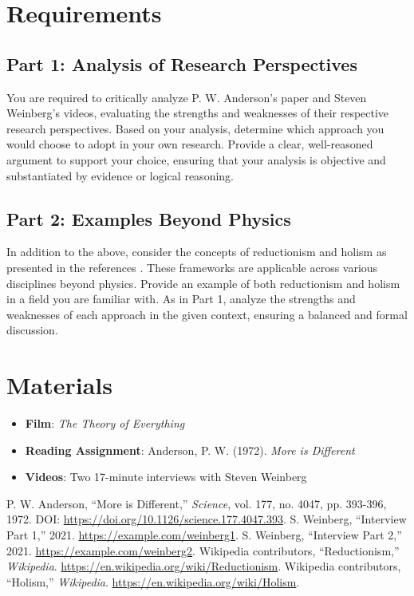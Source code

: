 \documentclass[a4paper,12pt]{article}
\begin{document}
\section*{Requirements}

\subsection*{Part 1: Analysis of Research Perspectives}

You are required to critically analyze P. W. Anderson's paper and Steven Weinberg’s videos, evaluating the strengths and weaknesses of their respective research perspectives. Based on your analysis, determine which approach you would choose to adopt in your own research. Provide a clear, well-reasoned argument to support your choice, ensuring that your analysis is objective and substantiated by evidence or logical reasoning.

\subsection*{Part 2: Examples Beyond Physics}

In addition to the above, consider the concepts of reductionism and holism as presented in the references \cite{WikipediaHolism, WikipediaReductionism}. These frameworks are applicable across various disciplines beyond physics. Provide an example of both reductionism and holism in a field you are familiar with. As in Part 1, analyze the strengths and weaknesses of each approach in the given context, ensuring a balanced and formal discussion.


\section*{Materials}

\begin{itemize}
    \item \textbf{Film}: \textit{The Theory of Everything}
    \item \textbf{Reading Assignment}: Anderson, P. W. (1972). \textit{More is Different} \cite{doi:10.1126/science.177.4047.393}
    \item \textbf{Videos}: Two 17-minute interviews with Steven Weinberg \cite{Weinberg2021, Weinberg2021Part2}
\end{itemize}

\begin{thebibliography}{99}
     P. W. Anderson, ``More is Different,'' \textit{Science}, vol. 177, no. 4047, pp. 393-396, 1972. DOI: \url{https://doi.org/10.1126/science.177.4047.393}.
     S. Weinberg, ``Interview Part 1,'' 2021. \url{https://example.com/weinberg1}.
     S. Weinberg, ``Interview Part 2,'' 2021. \url{https://example.com/weinberg2}.
     Wikipedia contributors, ``Reductionism,'' \textit{Wikipedia}. \url{https://en.wikipedia.org/wiki/Reductionism}.
     Wikipedia contributors, ``Holism,'' \textit{Wikipedia}. \url{https://en.wikipedia.org/wiki/Holism}.
\end{thebibliography}
\end{document}

